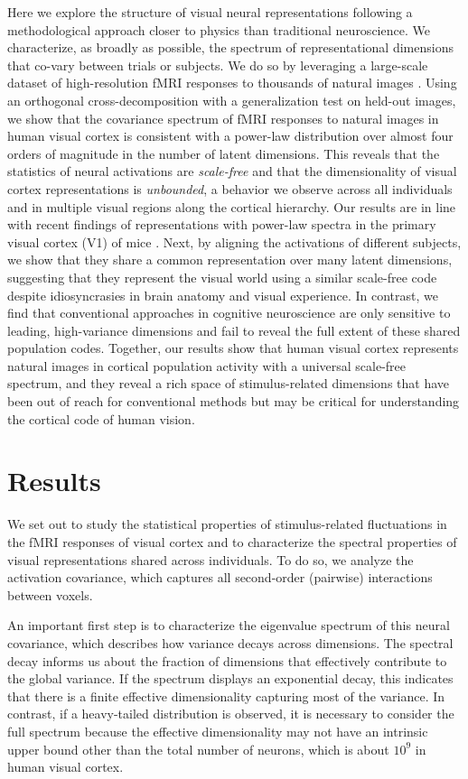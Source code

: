 \documentclass[10pt]{article}
\begin{document}
Here we explore the structure of visual neural representations following a methodological approach closer to physics than traditional neuroscience. We characterize, as broadly as possible, the spectrum of representational dimensions that co-vary between trials or subjects. We do so by leveraging a large-scale dataset of high-resolution fMRI responses to thousands of natural images \autocite{Allen2021}. Using an orthogonal cross-decomposition with a generalization test on held-out images, we show that the covariance spectrum of fMRI responses to natural images in human visual cortex is consistent with a power-law distribution over almost four orders of magnitude in the number of latent dimensions. This reveals that the statistics of neural activations are \emph{scale-free} and that the dimensionality of visual cortex representations is \emph{unbounded}, a behavior we observe across all individuals and in multiple visual regions along the cortical hierarchy. Our results are in line with recent findings of representations with power-law spectra in the primary visual cortex (V1) of mice \autocite{Stringer2019}. Next, by aligning the activations of different subjects, we show that they share a common representation over many latent dimensions, suggesting that they represent the visual world using a similar scale-free code despite idiosyncrasies in brain anatomy and visual experience. In contrast, we find that conventional approaches in cognitive neuroscience are only sensitive to leading, high-variance dimensions and fail to reveal the full extent of these shared population codes. Together, our results show that human visual cortex represents natural images in cortical population activity with a universal scale-free spectrum, and they reveal a rich space of stimulus-related dimensions that have been out of reach for conventional methods but may be critical for understanding the cortical code of human vision.

\section{Results}\label{results}

We set out to study the statistical properties of stimulus-related fluctuations in the fMRI responses of visual cortex and to characterize the spectral properties of visual representations shared across individuals. To do so, we analyze the activation covariance, which captures all second-order (pairwise) interactions between voxels.

An important first step is to characterize the eigenvalue spectrum of this neural covariance, which describes how variance decays across dimensions. The spectral decay informs us about the fraction of dimensions that effectively contribute to the global variance. If the spectrum displays an exponential decay, this indicates that there is a finite effective dimensionality capturing most of the variance. In contrast, if a heavy-tailed distribution is observed, it is necessary to consider the full spectrum because the effective dimensionality may not have an intrinsic upper bound other than the total number of neurons, which is about \(10^9\) in human visual cortex.
\end{document}
